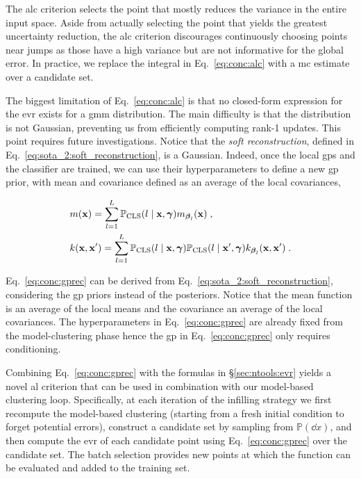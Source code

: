 The \gls{alc} criterion selects the point that mostly reduces the variance in the entire input space. Aside from actually selecting the point that yields the greatest uncertainty reduction, the \gls{alc} criterion discourages continuously choosing points near jumps as those have a high variance but are not informative for the global error. In practice, we replace the integral in Eq.~\eqref{eq:conc:alc} with a \gls{mc} estimate over a candidate set. 

\smallskip
The biggest limitation of Eq.~\eqref{eq:conc:alc} is that no closed-form expression for the \gls{evr} exists for a \gls{gmm} distribution. The main difficulty is that the distribution is not Gaussian, preventing us from efficiently computing rank-1 updates. This point requires future investigations. Notice that the \textit{soft reconstruction}, defined in Eq.~\eqref{eq:sota_2:soft_reconstruction}, is a Gaussian. Indeed, once the local \glspl{gp} and the classifier are trained, we can use their hyperparameters to define a new \gls{gp} prior, with mean and covariance defined as an average of the local covariances,

\begin{equation}
    \left.
        \begin{aligned}
            &m(\mathbf{x}) = \displaystyle \sum_{l=1}^{L} \mathbb{P}_{\mathrm{CLS}}(l \mid \mathbf{x}, \boldsymbol{\gamma}) m_{\boldsymbol{\beta}_l}(\mathbf{x}) \;,\\
            &k(\mathbf{x}, \mathbf{x}^\prime) = \displaystyle \sum_{l=1}^{L} \mathbb{P}_{\mathrm{CLS}}(l \mid \mathbf{x}, \boldsymbol{\gamma}) \mathbb{P}_{\mathrm{CLS}}(l \mid \mathbf{x}^\prime, \boldsymbol{\gamma}) k_{\boldsymbol{\beta}_l}(\mathbf{x}, \mathbf{x}^\prime) \;.
        \end{aligned}
    \right.
    \label{eq:conc:gprec}
\end{equation}

Eq.~\eqref{eq:conc:gprec} can be derived from Eq.~\eqref{eq:sota_2:soft_reconstruction}, considering the \gls{gp} priors instead of the posteriors. Notice that the mean function is an average of the local means and the covariance an average of the local covariances. The hyperparameters in Eq.~\eqref{eq:conc:gprec} are already fixed from the model-clustering phase hence the \gls{gp} in Eq.~\eqref{eq:conc:gprec} only requires conditioning. 

\smallskip
Combining Eq.~\eqref{eq:conc:gprec} with the formulas in \S\ref{sec:ntools:evr} yields a novel \gls{al} criterion that can be used in combination with our model-based clustering loop. Specifically, at each iteration of the infilling strategy we first recompute the model-based clustering (starting from a fresh initial condition to forget potential errors), construct a candidate set by sampling from $\mathbb{P}(\dd x)$, and then compute the \gls{evr} of each candidate point using Eq.~\eqref{eq:conc:gprec} over the candidate set. The batch selection provides new points at which the function can be evaluated and added to the training set. 

